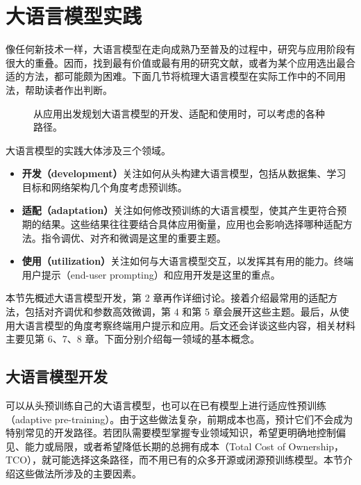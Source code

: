 \section{大语言模型实践}
像任何新技术一样，大语言模型在走向成熟乃至普及的过程中，研究与应用阶段有很大的重叠。因而，找到最有价值或最有用的研究文献，或者为某个应用选出最合适的方法，都可能颇为困难。下面几节将梳理大语言模型在实际工作中的不同用法，帮助读者作出判断。

\begin{figure}[!htbp]
\centering

\caption{从应用出发规划大语言模型的开发、适配和使用时，可以考虑的各种路径。}
\label{fig:ch01-paths}
\end{figure}

大语言模型的实践大体涉及三个领域。
\begin{itemize}
\item \textbf{开发（development）}关注如何从头构建大语言模型，包括从数据集、学习目标和网络架构几个角度考虑预训练。
\item \textbf{适配（adaptation）}关注如何修改预训练的大语言模型，使其产生更符合预期的结果。这些结果往往要结合具体应用衡量，应用也会影响选择哪种适配方法。指令调优、对齐和微调是这里的重要主题。
\item \textbf{使用（utilization）}关注如何与大语言模型交互，以发挥其有用的能力。终端用户提示（end-user prompting）和应用开发是这里的重点。
\end{itemize}

本节先概述大语言模型开发，第 2 章再作详细讨论。接着介绍最常用的适配方法，包括对齐调优和参数高效微调，第 4 和第 5 章会展开这些主题。最后，从使用大语言模型的角度考察终端用户提示和应用。后文还会详谈这些内容，相关材料主要见第 6、7、8 章。下面分别介绍每一领域的基本概念。

\subsection{大语言模型开发}
可以从头预训练自己的大语言模型，也可以在已有模型上进行适应性预训练（adaptive pre-training）。由于这些做法复杂，前期成本也高，预计它们不会成为特别常见的开发路径。若团队需要模型掌握专业领域知识，希望更明确地控制偏见、能力或局限，或者希望降低长期的总拥有成本（Total Cost of Ownership，TCO），就可能选择这条路径，而不用已有的众多开源或闭源预训练模型。本节介绍这些做法所涉及的主要因素。

